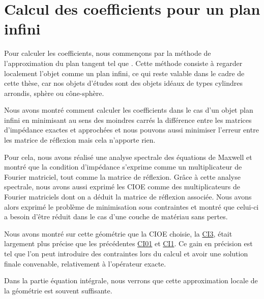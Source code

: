 \chapter{Calcul des coefficients pour un plan infini}
\label{sec:plan}
\minitoc
\newpage
{}
Pour calculer les coefficients, nous commençons par la méthode de l'approximation du plan tangent tel que \cite{hoppe_impedance_1995,marceaux_high-order_2000,aubakirov_electromagnetic_2014}. Cette méthode consiste à regarder localement l'objet comme un plan infini, ce qui reste valable dans le cadre de cette thèse, car nos objets d'études sont des objets idéaux de types cylindres arrondis, sphère ou cône-sphère.








Nous avons montré comment calculer les coefficients dans le cas d'un objet plan infini en minimisant au sens des moindres carrés la différence entre les matrices d'impédance exactes et approchées et  nous pouvons aussi minimiser l'erreur entre les matrice de réflexion mais cela n'apporte rien.

Pour cela, nous avons réalisé une analyse spectrale des équations de Maxwell et montré que la condition d'impédance s'exprime comme un multiplicateur de Fourier matriciel, tout comme la matrice de réflexion. Grâce à cette analyse spectrale, nous avons aussi exprimé les CIOE comme des multiplicateurs de Fourier matriciels dont on a déduit la matrice de réflexion associée. Nous avons alors exprimé le problème de minimisation sous contraintes et montré que celui-ci a besoin d'être réduit dans le cas d'une couche de matériau sans pertes.

Nous avons montré sur cette géométrie que la CIOE choisie, la \hyperlink{ci3}{CI3}, était largement plus précise que les précédentes \hyperlink{ci01}{CI01} et \hyperlink{ci1}{CI1}. Ce gain en précision est tel que l'on peut introduire des contraintes lors du calcul et avoir une solution finale convenable, relativement à l'opérateur exacte.

Dans la partie équation intégrale, nous verrons que cette approximation locale de la géométrie est souvent suffisante.
